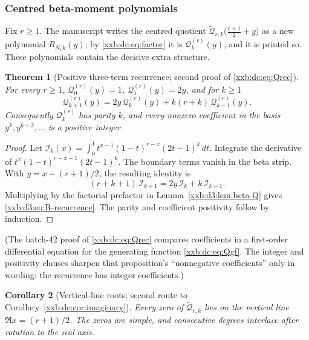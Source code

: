 \documentclass[11pt,a4paper]{article}
\numberwithin{equation}{section}
\newtheorem{theorem}{Theorem}[section]
\newtheorem{corollary}[theorem]{Corollary}
\theoremstyle{definition}
\theoremstyle{remark}
\theoremstyle{plain}
\begin{document}
\subsubsection{Centred beta-moment polynomials}\label{xxb:d3:sec:centered}

Fix $r\geq1$.  The manuscript writes the centred quotient
$\widetilde{\mathcal Q}_{r,k}\bigl(\frac{r+1}2+y\bigr)$ as a new polynomial
$R_{N,k}(y)$; by \eqref{xxb:dc:eq:factor} it is $\mathcal Q_k^{(r)}(y)$,
and it is printed so.  These polynomials contain the decisive extra
structure.

\begin{theorem}[Positive three-term recurrence; second proof of \eqref{xxb:dc:eq:Qrec}]
\label{xxb:d3:thm:R-recurrence}
For every $r\geq1$, $\mathcal Q_0^{(r)}(y)=1$, $\mathcal Q_1^{(r)}(y)=2y$, and for
$k\geq1$
\begin{equation}
 \label{xxb:d3:eq:R-recurrence}
 \mathcal Q_{k+1}^{(r)}(y)=2y\,\mathcal Q_k^{(r)}(y)+k(r+k)\,\mathcal Q_{k-1}^{(r)}(y).
\end{equation}
Consequently $\mathcal Q_k^{(r)}$ has parity $k$, and every nonzero coefficient
in the basis $y^{k},y^{k-2},\ldots$ is a positive integer.
\end{theorem}

\begin{proof}
Let $\mathcal I_k(x)=\int_0^1t^{x-1}(1-t)^{r-x}(2t-1)^k\,dt$.
Integrate the derivative of $t^x(1-t)^{r-x+1}(2t-1)^k$.  The boundary terms
vanish in the beta strip.  With $y=x-(r+1)/2$, the resulting identity is
\[
 (r+k+1)\,\mathcal I_{k+1}=2y\,\mathcal I_k+k\,\mathcal I_{k-1}.
\]
Multiplying by the factorial prefactor in Lemma~\ref{xxb:d3:lem:beta-Q}
gives \eqref{xxb:d3:eq:R-recurrence}.  The parity and coefficient positivity
follow by induction.
\end{proof}

(The batch-42 proof of \eqref{xxb:dc:eq:Qrec} compares coefficients in a
first-order differential equation for the generating function
\eqref{xxb:dc:eq:Qgf}.  The integer and positivity clauses sharpen that
proposition's ``nonnegative coefficients'' only in wording: the recurrence has
integer coefficients.)

\begin{corollary}[Vertical-line roots; second route to Corollary~\ref{xxb:dc:cor:imaginary}]
\label{xxb:d3:cor:vertical-roots}
Every zero of $\widetilde{\mathcal Q}_{r,k}$ lies on the vertical line
$\Re x=(r+1)/2$.  The zeros are simple, and consecutive degrees interlace
after rotation to the real axis.
\end{corollary}
\end{document}
